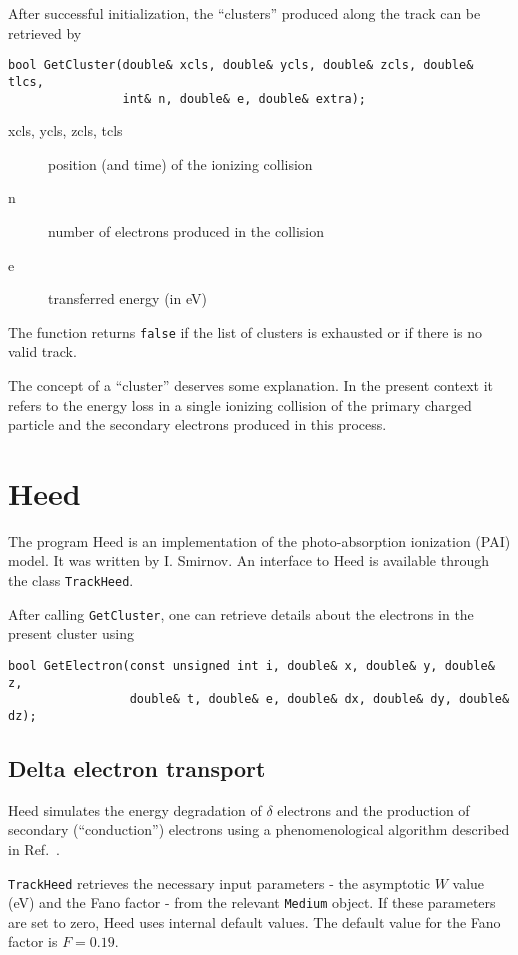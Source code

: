 After successful initialization, the ``clusters'' produced along the track
can be retrieved by
\begin{lstlisting}
bool GetCluster(double& xcls, double& ycls, double& zcls, double& tlcs,
                int& n, double& e, double& extra);
\end{lstlisting}
\begin{description}
  \item[xcls, ycls, zcls, tcls] 
  position (and time) of the ionizing collision
  \item[n] number of electrons produced in the collision
  \item[e] transferred energy (in eV)
\end{description}
The function returns \texttt{false} if the list of clusters is exhausted
 or if there is no valid track.

The concept of a ``cluster'' deserves some explanation. 
In the present context it refers to the energy loss in a single ionizing 
collision of the primary charged particle and the secondary 
electrons produced in this process. 


\section{Heed}\label{Sec:Heed}

The program Heed \cite{Smirnov2005} is an implementation 
of the photo-absorption ionization (PAI) model. 
It was written by I. Smirnov.
An interface to Heed is available through the class \texttt{TrackHeed}. 

After calling \texttt{GetCluster}, 
one can retrieve details about the 
electrons in the present cluster using
\begin{lstlisting}
bool GetElectron(const unsigned int i, double& x, double& y, double& z,
                 double& t, double& e, double& dx, double& dy, double& dz);
\end{lstlisting}

\subsection{Delta electron transport}

Heed simulates the energy degradation of \(\delta\) electrons and 
the production of secondary (``conduction'') electrons 
using a phenomenological algorithm described in Ref.~\cite{Smirnov2005}.

\texttt{TrackHeed} retrieves the necessary input parameters - the 
asymptotic \(W\) value (eV) and the Fano factor - 
from the relevant \texttt{Medium} object. 
If these parameters are set to zero, Heed uses internal default values. 
The default value for the Fano factor is \(F = 0.19\).

